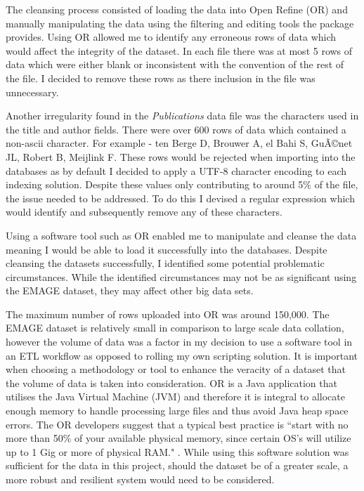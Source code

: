 The cleansing process consisted of loading the data into Open Refine (OR) and manually manipulating the data using the filtering and editing tools the package provides. Using OR allowed me to identify any erroneous rows of data which would affect the integrity of the dataset. In each file there was at most 5 rows of data which were either blank or inconsistent with the convention of the rest of the file. I decided to remove these rows as there inclusion in the file was unnecessary.

Another irregularity found in the \textit{Publications} data file was the characters used in the title and author fields. There were over 600 rows of data which contained a non-ascii character. For example - ten Berge D, Brouwer A, el Bahi S, GuÃ©net JL, Robert B, Meijlink F. These rows would be rejected when importing into the databases as by default I decided to apply a UTF-8 character encoding to each indexing solution. Despite these values only contributing to around 5\% of the file, the issue needed to be addressed. To do this I devised a regular expression which would identify and subsequently remove any of these characters.

Using a software tool such as OR enabled me to manipulate and cleanse the data meaning I would be able to load it successfully into the databases. Despite cleansing the datasets successfully, I identified some potential problematic circumstances. While the identified circumstances may not be as significant using the EMAGE dataset, they may affect other big data sets.

The maximum number of rows uploaded into OR was around 150,000. The EMAGE dataset is relatively small in comparison to large scale data collation, however the volume of data was a factor in my decision to use a software tool in an ETL workflow as opposed to rolling my own scripting solution. It is important when choosing a methodology or tool to enhance the veracity of a dataset that the volume of data is taken into consideration. OR is a Java application that utilises the Java Virtual Machine (JVM) and therefore it is integral to allocate enough memory to handle processing large files and thus avoid Java heap space errors. The OR developers suggest that a typical best practice is ``start with no more than 50\% of your available physical memory, since certain OS's will utilize up to 1 Gig or more of physical RAM." \cite{googref}. While using this software solution was sufficient for the data in this project, should the dataset be of a greater scale, a more robust and resilient system would need to be considered.

